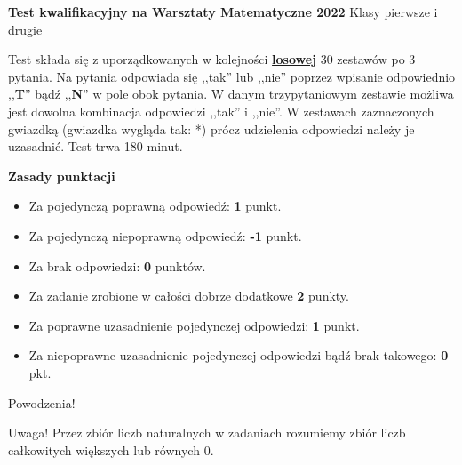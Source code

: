 \documentclass[12pt, a4paper]{article}
\begin{document}
	\begin{center}{\large{\hspace{1cm}\textbf{Test kwalifikacyjny na Warsztaty Matematyczne 2022}}}
				\newline \newline Klasy pierwsze i drugie\end{center}
\par
\vspace{0.3cm}
Test składa się z uporządkowanych w kolejności \underline{\textbf{losowej}} 30 zestawów po 3 pytania. Na pytania odpowiada się ,,tak'' lub ,,nie'' poprzez wpisanie odpowiednio ,,\textbf{T}'' bądź ,,\textbf{N}''
w pole obok pytania. W danym trzypytaniowym zestawie możliwa jest dowolna kombinacja
odpowiedzi ,,tak'' i ,,nie''. W zestawach zaznaczonych gwiazdką (gwiazdka wygląda tak: *)
prócz udzielenia odpowiedzi należy je uzasadnić. Test trwa 180 minut.
\vspace{0.5cm}
\par
\textbf{Zasady punktacji}
\begin{itemize}
   \item Za pojedynczą poprawną odpowiedź: \textbf{1} punkt.
   \item Za pojedynczą niepoprawną odpowiedź: \textbf{-1} punkt.
   \item Za brak odpowiedzi: \textbf{0} punktów.
   \item Za zadanie zrobione w całości dobrze dodatkowe \textbf{2} punkty.
   \item Za poprawne uzasadnienie pojedynczej odpowiedzi: \textbf{1} punkt.
   \item Za niepoprawne uzasadnienie pojedynczej odpowiedzi bądź brak takowego: \textbf{0} pkt.
\end{itemize}
	\begin{center}Powodzenia!\end{center}
Uwaga! Przez zbiór liczb naturalnych w zadaniach rozumiemy zbiór liczb całkowitych większych lub równych $0$.
\vspace{0.2cm}

\renewcommand{\labelitemi}{\LARGE{$\square$}}
\newcommand{\normalitem}{\stepcounter{enumi}\item[\textbf{\theenumi. }]}
\newcommand{\asterixitem}{\stepcounter{enumi}\item[\textbf{\theenumi*. }]}
\end{document}

